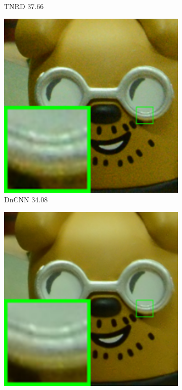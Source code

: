 \begin{figure}
\begin{subfigure}[t]{0.19\textwidth}
\caption{TNRD 37.66}
    \end{subfigure}
    \hfill
    \begin{subfigure}[t]{0.19\textwidth}
        \centering
        \includegraphics[width=1\textwidth]{images/twsc/cc/resize_br_DnCNN_d800_iso3200_1_real.png}
\caption{DnCNN 34.08}
    \end{subfigure}
\hfill
    \begin{subfigure}[t]{0.19\textwidth}
        \centering
        \includegraphics[width=1\textwidth]{images/twsc/cc/resize_br_NI_d800_iso3200_1_real.png}

\end{subfigure}
\end{figure}
